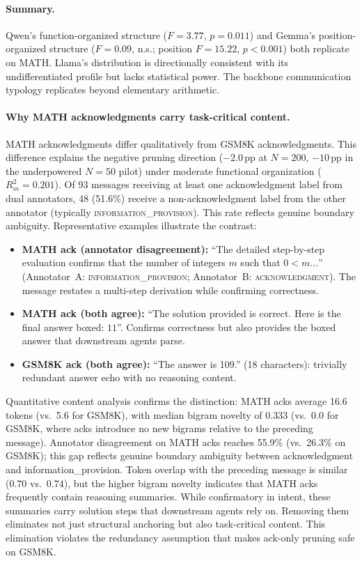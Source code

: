 \paragraph{Summary.} Qwen's function-organized structure ($F = 3.77$, $p = 0.011$) and Gemma's position-organized structure ($F = 0.09$, n.s.; position $F = 15.22$, $p < 0.001$) both replicate on MATH. Llama's distribution is directionally consistent with its undifferentiated profile but lacks statistical power. The backbone communication typology replicates beyond elementary arithmetic.

\paragraph{Why MATH acknowledgments carry task-critical content.}
MATH acknowledgments differ qualitatively from GSM8K acknowledgments. This difference explains the negative pruning direction ($-2.0$\,pp at $N{=}200$, $-10$\,pp in the underpowered $N{=}50$ pilot) under moderate functional organization ($R^2_m = 0.201$). Of 93 messages receiving at least one acknowledgment label from dual annotators, 48 (51.6\%) receive a non-acknowledgment label from the other annotator (typically \textsc{information\_provision}). This rate reflects genuine boundary ambiguity. Representative examples illustrate the contrast:

\begin{itemize}[nosep, leftmargin=*]
\item \textbf{MATH ack (annotator disagreement):} ``The detailed step-by-step evaluation confirms that the number of integers $m$ such that $0 < m \ldots$'' (Annotator~A: \textsc{information\_provision}; Annotator~B: \textsc{acknowledgment}). The message restates a multi-step derivation while confirming correctness.
\item \textbf{MATH ack (both agree):} ``The solution provided is correct. Here is the final answer boxed: $\boxed{11}$''. Confirms correctness but also provides the boxed answer that downstream agents parse.
\item \textbf{GSM8K ack (both agree):} ``The answer is 109.'' (18 characters): trivially redundant answer echo with no reasoning content.
\end{itemize}

\noindent Quantitative content analysis confirms the distinction: MATH acks average 16.6 tokens (vs.\ 5.6 for GSM8K), with median bigram novelty of 0.333 (vs.\ 0.0 for GSM8K, where acks introduce no new bigrams relative to the preceding message). Annotator disagreement on MATH acks reaches 55.9\% (vs.\ 26.3\% on GSM8K); this gap reflects genuine boundary ambiguity between acknowledgment and information\_provision. Token overlap with the preceding message is similar (0.70 vs.\ 0.74), but the higher bigram novelty indicates that MATH acks frequently contain reasoning summaries. While confirmatory in intent, these summaries carry solution steps that downstream agents rely on. Removing them eliminates not just structural anchoring but also task-critical content. This elimination violates the redundancy assumption that makes ack-only pruning safe on GSM8K.

